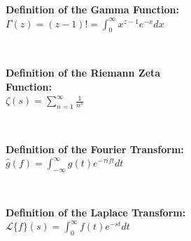 
\begin{minipage}{\textwidth}
    \textbf{Definition of the Gamma Function:}
    \\ \( \Gamma( z ) = ( z - 1 )! = \displaystyle\int_{0}^{\infty} { x^{z - 1} e^{-x} dx } \)
\end{minipage}
\\ \begin{minipage}{\textwidth}
    \textbf{Definition of the Riemann Zeta \\Function:}
    \\ \( \zeta( s ) = \displaystyle\sum_{n = 1}^{\infty} { \displaystyle\frac{ 1 }{ n^s } } \)
\end{minipage}
\\ \begin{minipage}{\textwidth}
    \textbf{Definition of the Fourier Transform:}
    \\ \( \hat{g}( f ) = \displaystyle\int_{-\infty}^{\infty} { g( t ) e^{-\tau i ft} dt } \)
\end{minipage}
\\ \begin{minipage}{\textwidth}
    \textbf{Definition of the Laplace Transform:}
    \\ \( \mathcal{L} \{ f \} ( s ) = \displaystyle\int_{0}^{\infty} { f( t ) e^{-st} dt } \)
\end{minipage}